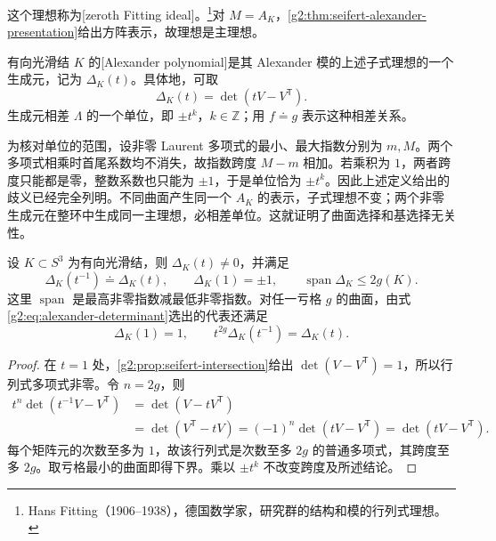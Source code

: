 这个理想称为[zeroth Fitting ideal]。\footnote{Hans Fitting（1906--1938），德国数学家，研究群的结构和模的行列式理想。}对 \(M=A_K\)，\cref{g2:thm:seifert-alexander-presentation}给出方阵表示，故理想是主理想。

\begin{definition}\label{g2:def:alexander-polynomial}
	有向光滑结 \(K\) 的[Alexander polynomial]是其 Alexander 模的上述子式理想的一个生成元，记为 \(\Delta_K(t)\)。具体地，可取
	\begin{equation}\label{g2:eq:alexander-determinant}
		\Delta_K(t)=\det(tV-V^{\mathsf T}).
	\end{equation}
	生成元相差 \(\Lambda\) 的一个单位，即 \(\pm t^k\)，\(k\in\mathbb Z\)；用 \(f\doteq g\) 表示这种相差关系。
\end{definition}

为核对单位的范围，设非零 Laurent 多项式的最小、最大指数分别为 \(m,M\)。两个多项式相乘时首尾系数均不消失，故指数跨度 \(M-m\) 相加。若乘积为 \(1\)，两者跨度只能都是零，整数系数也只能为 \(\pm1\)，于是单位恰为 \(\pm t^k\)。因此上述定义给出的歧义已经完全列明。不同曲面产生同一个 \(A_K\) 的表示，子式理想不变；两个非零生成元在整环中生成同一主理想，必相差单位。这就证明了曲面选择和基选择无关性。

\begin{proposition}\label{g2:prop:alexander-basic-properties}
	设 \(K\subset S^3\) 为有向光滑结，则 \(\Delta_K(t)\ne0\)，并满足
	\[
		\Delta_K(t^{-1})\doteq\Delta_K(t),\qquad
		\Delta_K(1)=\pm1,\qquad
		\operatorname{span}\Delta_K\leq2g(K).
	\]
	这里 \(\operatorname{span}\) 是最高非零指数减最低非零指数。对任一亏格 \(g\) 的曲面，由式\eqref{g2:eq:alexander-determinant}选出的代表还满足
	\[
		\Delta_K(1)=1,\qquad
		t^{2g}\Delta_K(t^{-1})=\Delta_K(t).
	\]
\end{proposition}
\begin{proof}
	在 \(t=1\) 处，\cref{g2:prop:seifert-intersection}给出 \(\det(V-V^{\mathsf T})=1\)，所以行列式多项式非零。令 \(n=2g\)，则
	\[
	\begin{aligned}
		t^n\det(t^{-1}V-V^{\mathsf T})
		&=\det(V-tV^{\mathsf T})\\
		&=\det(V^{\mathsf T}-tV)
		=(-1)^n\det(tV-V^{\mathsf T})
		=\det(tV-V^{\mathsf T}).
	\end{aligned}
	\]
	每个矩阵元的次数至多为 \(1\)，故该行列式是次数至多 \(2g\) 的普通多项式，其跨度至多 \(2g\)。取亏格最小的曲面即得下界。乘以 \(\pm t^k\) 不改变跨度及所述结论。
\end{proof}

